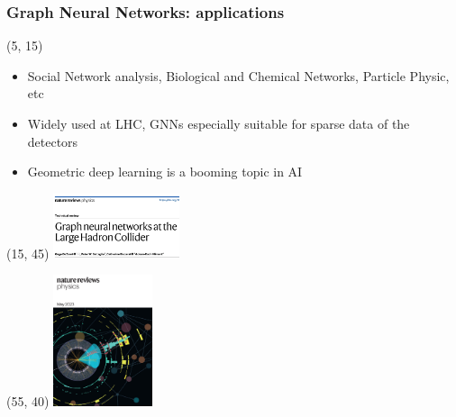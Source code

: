 \begin{frame}
    \frametitle{Graph Neural Networks: applications}
    \begin{textblock}{90}(5, 15)
      \begin{itemize}
        \item Social Network analysis, Biological and Chemical Networks, Particle Physic, etc
        \item Widely used at LHC, GNNs especially suitable for sparse data of the detectors
        \item Geometric deep learning is a booming topic in AI 
      \end{itemize}
    \end{textblock}

    \begin{textblock}{40}(15, 45)
      \includegraphics[width=140px]{img/gnn_lhc.png}
    \end{textblock}
    
    \begin{textblock}{30}(55, 40)
      \includegraphics[width=110px]{img/gnn_lhc2.jpg}
    \end{textblock}

\end{frame}



